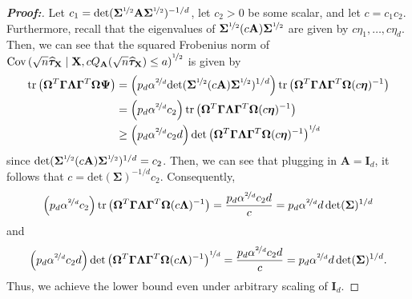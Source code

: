 \documentclass[11pt,twoside]{article}
\theoremstyle{definition}
\theoremstyle{remark}
\begin{document}
\begin{proof}[\textbf{Proof:}]
Let $c_1 = \text{det}( \mathbf{\Sigma}^{\nicefrac{1}{2}}\mathbf{A} \mathbf{\Sigma}^{\nicefrac{1}{2}})^{-1/d}$, let $c_2 > 0$ be some scalar, and let $c = c_1 c_2$. Furthermore, recall that the eigenvalues of $\mathbf{\Sigma}^{\nicefrac{1}{2}} (c\mathbf{A}) \mathbf{\Sigma}^{\nicefrac{1}{2}}$ are given by $c \eta_1, \ldots, c\eta_d$. Then, we can see that the squared Frobenius norm of $\text{Cov}\left(\sqrt{n}\widehat{\bm{\tau}}_{\mathbf{X}} \mid \mathbf{X}, c Q_{\mathbf{A}}(\sqrt{n} \widehat{\bm{\tau}}_{\mathbf{X}}) \leq a\right)^{\nicefrac{1}{2}}$ is given by
\begin{align*}
     \text{tr}\left(  \mathbf{\Omega}^T \mathbf{\Gamma} \mathbf{\Lambda} \mathbf{\Gamma}^T \mathbf{\Omega} \mathbf{\Psi}   \right) &= \left(p_d \alpha^{\nicefrac{2}{d}}\text{det}(\mathbf{\Sigma}^{\nicefrac{1}{2}}(c\mathbf{A})\mathbf{\Sigma}^{\nicefrac{1}{2}})^{1/d} \right) \text{tr}\left(  \mathbf{\Omega}^T \mathbf{\Gamma} \mathbf{\Lambda} \mathbf{\Gamma}^T \mathbf{\Omega} (c \bm{\eta})^{-1} \right) \\
    &= \left(p_d \alpha^{\nicefrac{2}{d}} c_2 \right) \text{tr}\left(  \mathbf{\Omega}^T \mathbf{\Gamma} \mathbf{\Lambda} \mathbf{\Gamma}^T \mathbf{\Omega}  (c \bm{\eta})^{-1}  \right) \\
    &\geq   \left(p_d \alpha^{\nicefrac{2}{d}} c_2 d \right)  \text{det}\left(  \mathbf{\Omega}^T \mathbf{\Gamma} \mathbf{\Lambda} \mathbf{\Gamma}^T \mathbf{\Omega} (c \bm{\eta})^{-1}   \right)^{\nicefrac{1}{d}}
\end{align*}
since $\text{det}(\mathbf{\Sigma}^{\nicefrac{1}{2}} (c\mathbf{A}) \mathbf{\Sigma}^{\nicefrac{1}{2}})^{1/d} = c_2$. Then, we can see that plugging in $\mathbf{A} = \mathbf{I}_d$, it follows that $c =  \text{det}(\mathbf{\Sigma})^{-1/d} c_2$. Consequently, 
\begin{align*}
    \left(p_d \alpha^{\nicefrac{2}{d}} c_2 \right) \text{tr}\left(  \mathbf{\Omega}^T \mathbf{\Gamma} \mathbf{\Lambda} \mathbf{\Gamma}^T \mathbf{\Omega}  (c \bm{\Lambda})^{-1}  \right) =  \frac{p_d \alpha^{\nicefrac{2}{d}} c_2 d}{c} = p_d \alpha^{\nicefrac{2}{d}} d \, \text{det}(\mathbf{\Sigma})^{1/d}
\end{align*}
and 
\begin{align*}
    \left(p_d \alpha^{\nicefrac{2}{d}} c_2 d \right)  \text{det}\left(  \mathbf{\Omega}^T \mathbf{\Gamma} \mathbf{\Lambda} \mathbf{\Gamma}^T \mathbf{\Omega} (c \mathbf{\Lambda})^{-1}   \right)^{\nicefrac{1}{d}} = \frac{p_d \alpha^{\nicefrac{2}{d}} c_2 d}{c} =  p_d \alpha^{\nicefrac{2}{d}} d \, \text{det}(\mathbf{\Sigma})^{1/d}.
\end{align*}
Thus, we achieve the lower bound even under arbitrary scaling of $\mathbf{I}_d$.

\end{proof}
\end{document}
